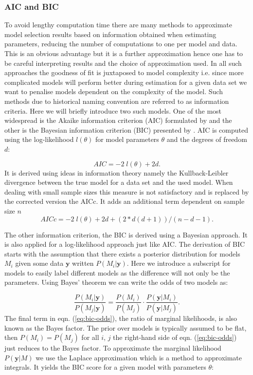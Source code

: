\subsubsection{AIC and BIC}
\label{sec:aic}

To avoid lengthy computation time there are many methods to approximate model selection results based on information obtained when estimating parameters, reducing the number of computations to one per model and data. This is an obvious advantage but it is a further approximation hence one has to be careful interpreting results and the choice of approximation used. In all such approaches the goodness of fit is juxtaposed to model complexity i.e. since more complicated models will perform better during estimation for a given data set we want to penalise models dependent on the complexity of the model. Such methods due to historical naming convention are referred to as information criteria. Here we will briefly introduce two such models. One of the most widespread is the Akaike information criterion (AIC) formulated by \cite{Akaike:1974ih} and the other is the Bayesian information criterion (BIC) presented by \cite{Schwarz:1978uv}. AIC is computed using the log-likelihood $l(\theta)$ for model parameters $\theta$ and the degrees of freedom $d$:

\begin{equation}
  \label{eq:aic-def}
  AIC = -2 \;l(\theta) + 2 d.
\end{equation}
It is derived using ideas in information theory namely the Kullback-Leibler divergence between the true model for a data set and the used model. When dealing with small sample sizes this measure is not satisfactory and is replaced by the corrected version the AICc. It adds an additional term dependent on sample size $n$
\begin{equation}
 AICc = -2 \; l(\theta) +2d + (2 * d (d + 1)) / (n - d - 1).
\end{equation}


The other information criterion, the BIC is derived using a Bayesian approach. It is also applied for a log-likelihood approach just like AIC. The derivation of BIC starts with the assumption that there exists a posterior distribution for models $M_i$ given some data $\mathbf{y}$ written $P(M_i| \mathbf{y})$. Here we introduce a subscript for models to easily label different models as the difference will not only be the parameters. Using Bayes' theorem we can write the odds of two models as:

\begin{equation}
  \label{eq:bic-odds}
  \frac{P(M_i|\mathbf{y})}{P(M_j|\mathbf{y})} = \frac{P(M_i)}{P(M_j)} \cdot \frac{P(\mathbf{y}|M_i)}{P(\mathbf{y} |M_j)}.
\end{equation}
The final term in eqn. (\ref{eq:bic-odds}), the ratio of marginal likelihoods, is also known as the Bayes factor. The prior over models is typically assumed to be flat, then $P(M_i) = P(M_j)$ for all $i$, $j$ the right-hand side of eqn. (\ref{eq:bic-odds}) just reduces to the Bayes factor. To approximate the marginal likelihood $P(\mathbf{y} | M)$ we use the Laplace approximation which is a method to approximate integrals. It yields the BIC score for a given model with parameters $\theta$:

